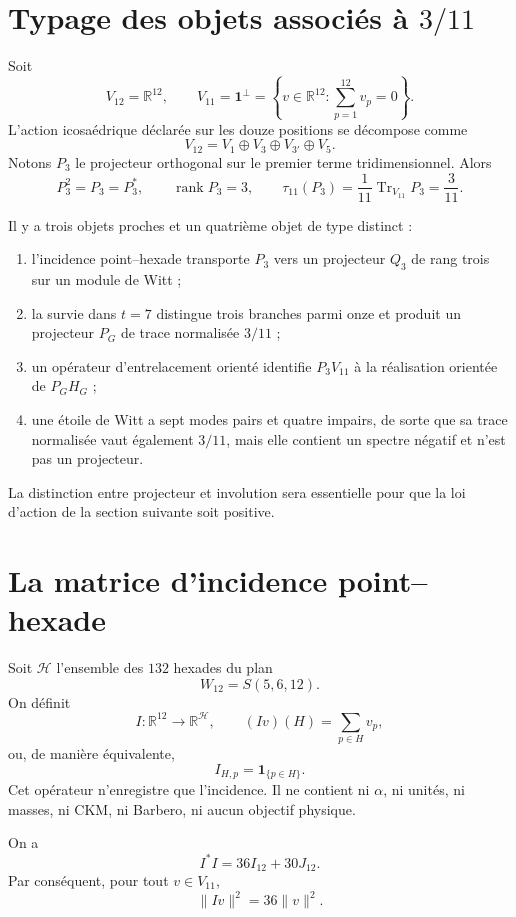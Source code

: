 \section{Typage des objets associés à \texorpdfstring{\(3/11\)}{3/11}}

Soit
\[
 V_{12}=\mathbb R^{12},
 \qquad
 V_{11}=\mathbf 1^\perp
 =\left\{v\in\mathbb R^{12}:\sum_{p=1}^{12}v_p=0\right\}.
\]
L'action icosaédrique déclarée sur les douze positions se décompose comme
\[
 V_{12}=V_1\oplus V_3\oplus V_{3'}\oplus V_5.
\]
Notons \(P_3\) le projecteur orthogonal sur le premier terme
tridimensionnel. Alors
\[
 P_3^2=P_3=P_3^*,
 \qquad
 \operatorname{rank}P_3=3,
 \qquad
 \tau_{11}(P_3)
 =\frac1{11}\operatorname{Tr}_{V_{11}}P_3
 =\frac3{11}.
\]

Il y a trois objets proches et un quatrième objet de type distinct :
\begin{enumerate}
  \item l'incidence point--hexade transporte \(P_3\) vers un projecteur
  \(Q_3\) de rang trois sur un module de Witt ;
  \item la survie dans \(t=7\) distingue trois branches parmi onze et
  produit un projecteur \(P_G\) de trace normalisée \(3/11\) ;
  \item un opérateur d'entrelacement orienté identifie
  \(P_3V_{11}\) à la réalisation orientée de \(P_GH_G\) ;
  \item une étoile de Witt a sept modes pairs et quatre impairs,
  de sorte que sa trace normalisée vaut également \(3/11\), mais elle contient un spectre
  négatif et n'est pas un projecteur.
\end{enumerate}
La distinction entre projecteur et involution sera essentielle pour que la loi
d'action de la section suivante soit positive.

\section{La matrice d'incidence point--hexade}

Soit \(\mathcal H\) l'ensemble des \(132\) hexades du plan
\[
 W_{12}=S(5,6,12).
\]
On définit
\[
 I:\mathbb R^{12}\longrightarrow\mathbb R^{\mathcal H},
 \qquad
 (Iv)(H)=\sum_{p\in H}v_p,
\]
ou, de manière équivalente,
\[
 I_{H,p}=\mathbf 1_{\{p\in H\}}.
\]
Cet opérateur n'enregistre que l'incidence. Il ne contient ni \(\alpha\), ni unités,
ni masses, ni CKM, ni Barbero, ni aucun objectif physique.

\begin{lemma}
\label{lem:incidencia-metrica-witt}
On a
\[
 \boxed{I^*I=36I_{12}+30J_{12}.}
\]
Par conséquent, pour tout \(v\in V_{11}\),
\[
 \|Iv\|^2=36\|v\|^2.
\]
\end{lemma}


